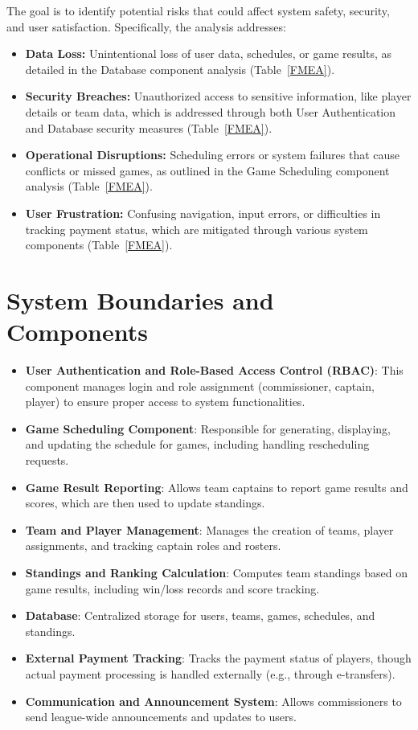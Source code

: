 \documentclass{article}
\begin{document}
The goal is to identify potential risks that could affect system safety, security, and user satisfaction. Specifically, the analysis addresses:
\begin{itemize}
    \item \textbf{Data Loss:} Unintentional loss of user data, schedules, or game results, as detailed in the Database component analysis (Table~\ref{FMEA}).
    \item \textbf{Security Breaches:} Unauthorized access to sensitive information, like player details or team data, which is addressed through both User Authentication and Database security measures (Table~\ref{FMEA}).
    \item \textbf{Operational Disruptions:} Scheduling errors or system failures that cause conflicts or missed games, as outlined in the Game Scheduling component analysis (Table~\ref{FMEA}).
    \item \textbf{User Frustration:} Confusing navigation, input errors, or difficulties in tracking payment status, which are mitigated through various system components (Table~\ref{FMEA}).
\end{itemize}

\section{System Boundaries and Components}

\begin{itemize}
    \item \textbf{User Authentication and Role-Based Access Control (RBAC)}: This component manages login and role assignment (commissioner, captain, player) to ensure proper access to system functionalities.
    \item \textbf{Game Scheduling Component}: Responsible for generating, displaying, and updating the schedule for games, including handling rescheduling requests.
    \item \textbf{Game Result Reporting}: Allows team captains to report game results and scores, which are then used to update standings.
    \item \textbf{Team and Player Management}: Manages the creation of teams, player assignments, and tracking captain roles and rosters.
    \item \textbf{Standings and Ranking Calculation}: Computes team standings based on game results, including win/loss records and score tracking.
    \item \textbf{Database}: Centralized storage for users, teams, games, schedules, and standings.
    \item \textbf{External Payment Tracking}: Tracks the payment status of players, though actual payment processing is handled externally (e.g., through e-transfers).
    \item \textbf{Communication and Announcement System}: Allows commissioners to send league-wide announcements and updates to users.
\end{itemize}
\end{document}
